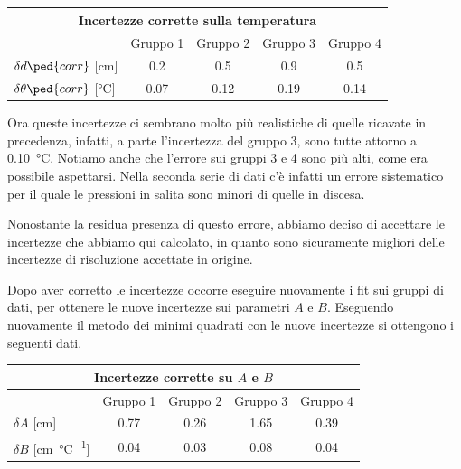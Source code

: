 \begin{center}
    \begin{tabular}{l c c c c}
        \multicolumn{5}{c}{\textbf{Incertezze corrette sulla temperatura}} \\
        \toprule
        & Gruppo 1 & Gruppo 2 & Gruppo 3 & Gruppo 4 \\
        \midrule
        $\delta d\ped{corr}$ [cm] & 0.2 & 0.5 & 0.9 & 0.5 \\
        $\delta \theta\ped{corr}$ [\si{\celsius}] & 0.07 & 0.12 & 0.19 & 0.14 \\
        \bottomrule
    \end{tabular}
\end{center}

Ora queste incertezze ci sembrano molto più realistiche di quelle ricavate in precedenza, infatti, a parte l'incertezza del 
gruppo 3, sono tutte attorno a \SI{0.10}{\celsius}. Notiamo anche che l'errore sui gruppi 3 e 4 sono più alti, come era possibile aspettarsi.
Nella seconda serie di dati c'è infatti un errore sistematico per il quale le pressioni in salita sono minori di quelle in discesa.

Nonostante la residua presenza di questo errore, abbiamo deciso di accettare le incertezze che abbiamo qui calcolato, in quanto
sono sicuramente migliori delle incertezze di risoluzione accettate in origine.

Dopo aver corretto le incertezze occorre eseguire nuovamente i fit sui gruppi di dati, per ottenere le nuove incertezze sui parametri
$A$ e $B$. Eseguendo nuovamente il metodo dei minimi quadrati con le nuove incertezze si ottengono i seguenti dati.

\begin{center}
    \begin{tabular}{l c c c c}
        \multicolumn{5}{c}{\textbf{Incertezze corrette su $A$ e $B$}} \\
        \toprule
        & Gruppo 1 & Gruppo 2 & Gruppo 3 & Gruppo 4 \\
        \midrule
        $\delta A$ [cm] & 0.77 & 0.26 & 1.65 & 0.39 \\
        $\delta B$ [\si{\centi\metre\per\celsius}] & 0.04 & 0.03 & 0.08 & 0.04 \\
        \bottomrule
    \end{tabular}
\end{center}

